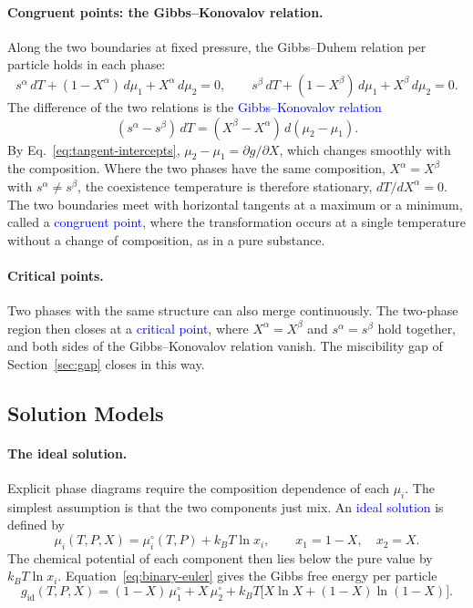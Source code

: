 \paragraph{Congruent points: the Gibbs--Konovalov relation.}
Along the two boundaries at fixed pressure, the Gibbs--Duhem relation per
particle holds in each phase:
\begin{equation*}
    s^\alpha\,dT+(1-X^\alpha)\,d\mu_1+X^\alpha\,d\mu_2=0,\qquad
    s^\beta\,dT+(1-X^\beta)\,d\mu_1+X^\beta\,d\mu_2=0.
\end{equation*}
The difference of the two relations is the
\textcolor{blue}{Gibbs--Konovalov relation}
\begin{equation}
    \boxed{(s^\alpha-s^\beta)\,dT=(X^\beta-X^\alpha)\,d(\mu_2-\mu_1).}
\end{equation}
By Eq.~\eqref{eq:tangent-intercepts}, $\mu_2-\mu_1=\partial g/\partial X$,
which changes smoothly with the composition. Where the two phases have the
same composition, $X^\alpha=X^\beta$ with $s^\alpha\neq s^\beta$, the
coexistence temperature is therefore stationary, $dT/dX^\alpha=0$. The two
boundaries meet with horizontal tangents at a maximum or a minimum, called a
\textcolor{blue}{congruent point}, where the transformation occurs at a
single temperature without a change of composition, as in a pure substance.

\paragraph{Critical points.}
Two phases with the same structure can also merge continuously. The
two-phase region then closes at a \textcolor{blue}{critical point}, where
$X^\alpha=X^\beta$ and $s^\alpha=s^\beta$ hold together, and both sides of
the Gibbs--Konovalov relation vanish. The miscibility gap of
Section~\ref{sec:gap} closes in this way.

\subsection{Solution Models}

\paragraph{The ideal solution.}
Explicit phase diagrams require the composition dependence of each $\mu_i$.
The simplest assumption is that the two components just mix. An
\textcolor{blue}{ideal solution} is defined by
\begin{equation}
    \boxed{\mu_i(T,P,X)=\mu_i^\circ(T,P)+k_BT\ln x_i,\qquad x_1=1-X,\quad x_2=X.}
    \label{eq:ideal-mu}
\end{equation}
The chemical potential of each component then lies below the pure value by
$k_BT\ln x_i$. Equation~\eqref{eq:binary-euler} gives the Gibbs free energy
per particle
\begin{equation}
    \boxed{g_{\text{id}}(T,P,X)=(1-X)\,\mu_1^\circ+X\,\mu_2^\circ
    +k_BT\big[X\ln X+(1-X)\ln(1-X)\big].}
\end{equation}

